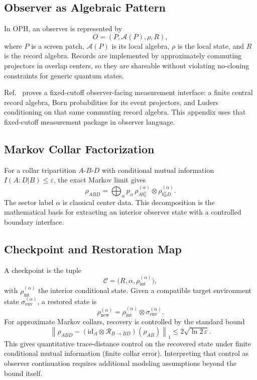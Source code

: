 \subsection{Observer as Algebraic Pattern}

In OPH, an observer is represented by
\[
O=(P,\mathcal{A}(P),\rho,R),
\]
where \(P\) is a screen patch, \(\mathcal{A}(P)\) is its local algebra, \(\rho\) is the local
state, and \(R\) is the record algebra. Records are implemented by approximately commuting
projectors in overlap centers, so they are shareable without violating no-cloning constraints for
generic quantum states.

Ref.~\cite{ophmicrophysics} proves a fixed-cutoff observer-facing measurement interface: a
finite central record algebra, Born probabilities for its event projectors, and Luders
conditioning on that same commuting record algebra. This appendix uses that fixed-cutoff
measurement package in observer language.

\subsection{Markov Collar Factorization}

For a collar tripartition \(A\)-\(B\)-\(D\) with conditional mutual information
\(I(A:D|B)\le\varepsilon\), the exact Markov limit gives
\[
\rho_{ABD}
=\bigoplus_{\alpha} p_{\alpha}\,
\rho^{(\alpha)}_{A b_L^{\alpha}}
\otimes
\rho^{(\alpha)}_{b_R^{\alpha} D}.
\]
The sector label \(\alpha\) is classical center data. This decomposition is the mathematical
basis for extracting an interior observer state with a controlled boundary interface.

\subsection{Checkpoint and Restoration Map}

A checkpoint is the tuple
\[
\mathcal{C}=\bigl(R,\alpha,\rho_{\mathrm{int}}^{(\alpha)}\bigr),
\]
with \(\rho_{\mathrm{int}}^{(\alpha)}\) the interior conditional state. Given a compatible target
environment state \(\sigma_{\mathrm{env}}^{(\alpha)}\), a restored state is
\[
\rho_{\mathrm{new}}^{(\alpha)}
=
\rho_{\mathrm{int}}^{(\alpha)}
\otimes
\sigma_{\mathrm{env}}^{(\alpha)}.
\]
For approximate Markov collars, recovery is controlled by the standard bound
\[
\left\|
\rho_{ABD}
-
(\mathrm{id}_A\otimes\mathcal{R}_{B\to BD})(\rho_{AB})
\right\|_1
\le
2\sqrt{\ln 2\,\varepsilon}.
\]
This gives quantitative trace-distance control on the recovered state under finite conditional
mutual information (finite collar error). Interpreting that control as observer continuation
requires additional modeling assumptions beyond the bound itself.

